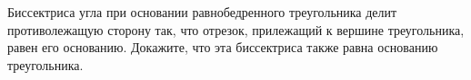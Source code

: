 \begin{ex}
	\begin{condition}
		Биссектриса угла при основании равнобедренного треугольника делит противолежащую сторону так, что отрезок, прилежащий к вершине треугольника, равен его основанию. Докажите, что эта биссектриса также равна основанию треугольника.
	\end{condition}
\end{ex}